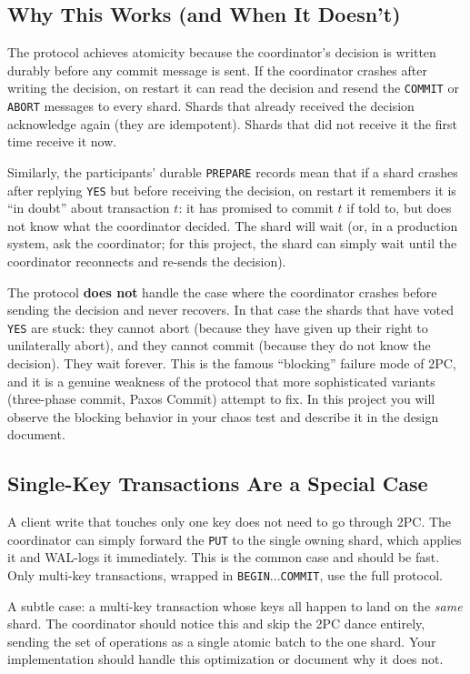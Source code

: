 \documentclass[11pt,a4paper]{article}
\begin{document}
\subsection{Why This Works (and When It Doesn't)}
The protocol achieves atomicity because the coordinator's decision is written durably before any commit message is sent. If the coordinator crashes after writing the decision, on restart it can read the decision and resend the \texttt{COMMIT} or \texttt{ABORT} messages to every shard. Shards that already received the decision acknowledge again (they are idempotent). Shards that did not receive it the first time receive it now.

Similarly, the participants' durable \texttt{PREPARE} records mean that if a shard crashes after replying \texttt{YES} but before receiving the decision, on restart it remembers it is ``in doubt'' about transaction $t$: it has promised to commit $t$ if told to, but does not know what the coordinator decided. The shard will wait (or, in a production system, ask the coordinator; for this project, the shard can simply wait until the coordinator reconnects and re-sends the decision).

The protocol \textbf{does not} handle the case where the coordinator crashes before sending the decision and never recovers. In that case the shards that have voted \texttt{YES} are stuck: they cannot abort (because they have given up their right to unilaterally abort), and they cannot commit (because they do not know the decision). They wait forever. This is the famous ``blocking'' failure mode of 2PC, and it is a genuine weakness of the protocol that more sophisticated variants (three-phase commit, Paxos Commit) attempt to fix. In this project you will observe the blocking behavior in your chaos test and describe it in the design document.

\subsection{Single-Key Transactions Are a Special Case}
A client write that touches only one key does not need to go through 2PC. The coordinator can simply forward the \texttt{PUT} to the single owning shard, which applies it and WAL-logs it immediately. This is the common case and should be fast. Only multi-key transactions, wrapped in \texttt{BEGIN}...\texttt{COMMIT}, use the full protocol.

A subtle case: a multi-key transaction whose keys all happen to land on the \textit{same} shard. The coordinator should notice this and skip the 2PC dance entirely, sending the set of operations as a single atomic batch to the one shard. Your implementation should handle this optimization or document why it does not.
\end{document}
